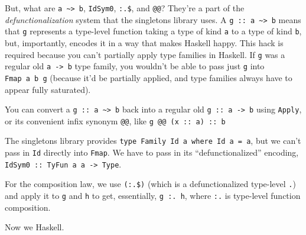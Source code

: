 \documentclass[]{article}
\begin{document}
But, what are \texttt{a\ \textasciitilde{}\textgreater{}\ b}, \texttt{IdSym0},
\texttt{:.\$}, and \texttt{@@}? They're a part of the \emph{defunctionalization}
system that the singletons library uses. A
\texttt{g\ ::\ a\ \textasciitilde{}\textgreater{}\ b} means that \texttt{g}
represents a type-level function taking a type of kind \texttt{a} to a type of
kind \texttt{b}, but, importantly, encodes it in a way that makes Haskell happy.
This hack is required because you can't partially apply type families in
Haskell. If \texttt{g} was a regular old \texttt{a\ -\textgreater{}\ b} type
family, you wouldn't be able to pass just \texttt{g} into \texttt{Fmap\ a\ b\ g}
(because it'd be partially applied, and type families always have to appear
fully saturated).

You can convert a \texttt{g\ ::\ a\ \textasciitilde{}\textgreater{}\ b} back
into a regular old \texttt{g\ ::\ a\ -\textgreater{}\ b} using \texttt{Apply},
or its convenient infix synonym \texttt{@@}, like
\texttt{g\ @@\ (x\ ::\ a)\ ::\ b}

The singletons library provides
\texttt{type\ Family\ Id\ a\ where\ Id\ a\ =\ a}, but we can't pass in
\texttt{Id} directly into \texttt{Fmap}. We have to pass in its
``defunctionalized'' encoding,
\texttt{IdSym0\ ::\ TyFun\ a\ a\ -\textgreater{}\ Type}.

For the composition law, we use \texttt{(:.\$)} (which is a defunctionalized
type-level \texttt{.}) and apply it to \texttt{g} and \texttt{h} to get,
essentially, \texttt{g\ :.\ h}, where \texttt{:.} is type-level function
composition.

Now we Haskell.
\end{document}
